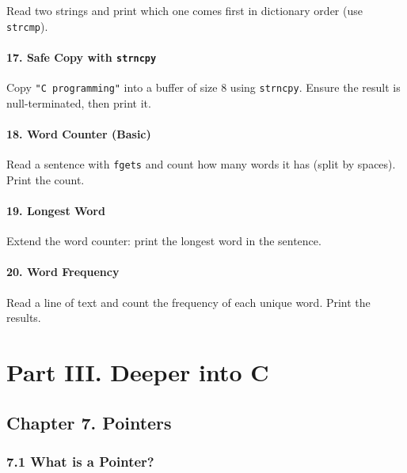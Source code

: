 \documentclass[
  letterpaper,
  DIV=11,
  numbers=noendperiod]{scrreprt}
\begin{document}
Read two strings and print which one comes first in dictionary order
(use \texttt{strcmp}).

\subsubsection{\texorpdfstring{17. Safe Copy with
\texttt{strncpy}}{17. Safe Copy with strncpy}}\label{safe-copy-with-strncpy}

Copy \texttt{"C\ programming"} into a buffer of size 8 using
\texttt{strncpy}. Ensure the result is null-terminated, then print it.

\subsubsection{18. Word Counter (Basic)}\label{word-counter-basic}

Read a sentence with \texttt{fgets} and count how many words it has
(split by spaces). Print the count.

\subsubsection{19. Longest Word}\label{longest-word}

Extend the word counter: print the longest word in the sentence.

\subsubsection{20. Word Frequency}\label{word-frequency}

Read a line of text and count the frequency of each unique word. Print
the results.


\chapter{Part III. Deeper into C}\label{part-iii.-deeper-into-c}

\section{Chapter 7. Pointers}\label{chapter-7.-pointers}

\subsection{7.1 What is a Pointer?}\label{what-is-a-pointer}
\end{document}
